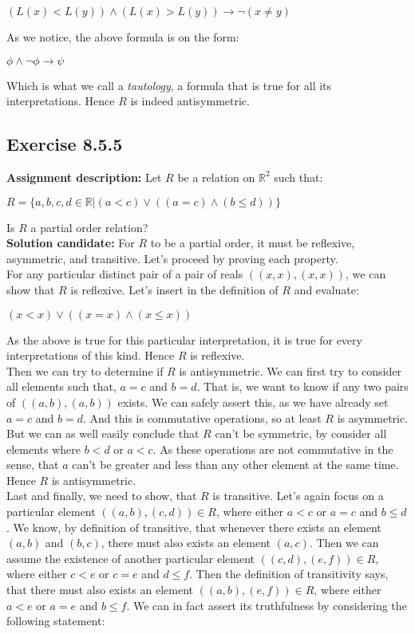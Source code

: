 \documentclass{report}
\newcommand{\cent}[1]{\begin{center}#1\end{center}}
\newcommand{\doubleR}{\mathbb{R}}
\newcommand{\In}{\! \in \!}
\newcommand{\AssignmentDescription}{\textbf{Assignment description: }}
\newcommand{\Solution}{\textbf{Solution candidate: }}
\newcommand{\QED}{\boxed{}}
\newcommand{\Exercise}[1]{\subsection{Exercise #1}}
\begin{document}
	\cent{$(L(x) < L(y)) \wedge (L(x) > L(y))\to \neg(x \neq y)$}
	
	As we notice, the above formula is on the form:
	
	\cent{$ \phi \wedge \neg \phi\to \psi$}
	
	Which is what we call a  \textit{tautology}, a formula that is true for all its interpretations. Hence $R$ is indeed antisymmetric.\\
	\QED
	
	\Exercise{8.5.5}
	\AssignmentDescription
	Let $R$ be a relation on $\doubleR^2$ such that:
	
	\cent{$R = \{ a,b,c,d \In \doubleR | (a < c) \vee ((a = c) \wedge (b \leq d))\}$}
	
	Is $R$ a partial order relation?\\
	
	\Solution
	For $R$ to be a partial order, it must be reflexive, asymmetric, and transitive. Let's proceed by proving each property.\\
	
	For any particular distinct pair of a pair of reals $((x,x),(x,x))$, we can show that $R$ is reflexive. Let's insert in the definition of $R$ and evaluate:
	
	\cent{$(x < x) \vee ((x = x) \wedge (x \leq x))$}
	
	As the above is true for this particular interpretation, it is true for every interpretations of this kind. Hence $R$ is reflexive.\\
	
	Then we can try to determine if $R$ is antisymmetric. We can first try to consider all elements such that, $a=c$ and $b = d$. That is, we want to know if any two pairs of  $((a,b),(a,b))$ exists. We can safely assert this, as we have already set $a=c$ and $b=d$. And this is commutative operations, so at least $R$ is asymmetric. But we can as well easily conclude that $R$ can't be symmetric, by consider all elements where $b < d$ or $a< c$. As these operations are not commutative in the sense, that $a$ can't be greater and less than any other element at the same time. Hence $R$ is antisymmetric.\\
	
	Last and finally, we need to show, that $R$ is transitive. Let's again focus on a particular element $((a,b),(c,d)) \In R$, where either $a < c$ or $a = c$ and $b \leq d$. We know, by definition of transitive, that whenever there exists an element $(a,b)$ and $(b,c)$, there must also exists an element $(a,c)$. Then we can assume the existence of another particular element $((c,d),(e,f)) \In R$, where either $c < e$  or $c=e$ and $d \leq f$. Then the definition of transitivity says, that there must also exists an element $((a,b),(e,f)) \In R$, where either $a<e$ or $a=e$ and $b \leq f$. We can in fact assert its truthfulness by considering the following statement:
	
\end{document}
